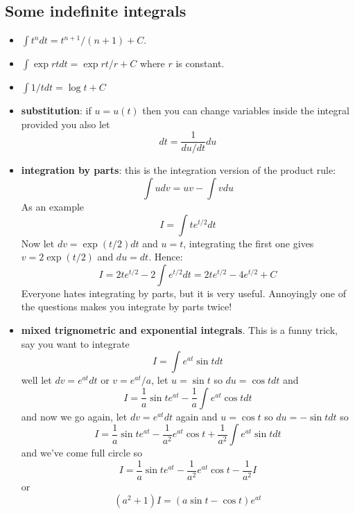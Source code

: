 \documentclass[11pt,a4paper]{scrartcl}
\begin{document}
\subsection*{Some indefinite integrals}
\begin{itemize}
\item $\int t^ndt =t^{n+1}/(n+1)+C$.
\item $\int \exp{rt}dt = \exp{rt}/r +C$ where $r$ is constant.
\item $\int 1/t{} dt = \log{t}+C$
\item \textbf{substitution}: if $u=u(t)$ then you can change variables inside the integral provided you also let
  \begin{equation}
    dt=\frac{1}{du/dt}du
  \end{equation}
\item \textbf{integration by parts}: this is the integration version of the product rule:
  \begin{equation}
    \int udv =uv-\int vdu
  \end{equation}
  As an example
  \begin{equation}
    I=\int te^{t/2}dt
  \end{equation}
  Now let $dv=\exp{(t/2)}dt$ and $u=t$, integrating the first one gives $v=2\exp{(t/2)}$ and $du=dt$. Hence:
  \begin{equation}
    I=2te^{t/2}-2\int e^{t/2}dt=2te^{t/2}-4e^{t/2}+C
  \end{equation}
  Everyone hates integrating by parts, but it is very useful. Annoyingly one of the questions makes you integrate by parts twice!
\item \textbf{mixed trignometric and exponential integrals}. This is a funny trick, say you want to integrate
  \begin{equation}
    I=\int e^{at}\sin{t}dt
  \end{equation}
  well let $dv=e^{at}dt$ or $v=e^{at}/a$, let $u=\sin{t}$ so $du=\cos{t}dt$ and
  \begin{equation}
    I=\frac{1}{a}\sin{t}e^{at}-\frac{1}{a}\int e^{at}\cos{t}dt
  \end{equation}
  and now we go again, let $dv=e^{at}dt$ again and $u=\cos{t}$ so $du=-\sin{t}dt$ so
  \begin{equation}
    I=\frac{1}{a}\sin{t}e^{at}-\frac{1}{a^2}e^{at}\cos{t}+\frac{1}{a^2}\int e^{at}\sin{t}dt
  \end{equation}
  and we've come full circle so
\begin{equation}
    I=\frac{1}{a}\sin{t}e^{at}-\frac{1}{a^2}e^{at}\cos{t}-\frac{1}{a^2}I
  \end{equation}
or
\begin{equation}
  (a^2+1)I=(a\sin{t}-\cos{t})e^{at}
\end{equation}
\end{itemize}
\end{document}

